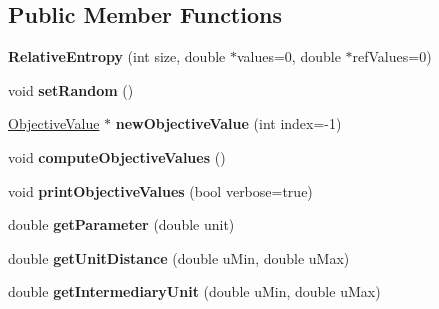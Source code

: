 \subsection*{Public Member Functions}
\begin{DoxyCompactItemize}
\item 
\hypertarget{classRelativeEntropy_a3681c506bf2071f11af6373ed2d2c570}{{\bfseries Relative\-Entropy} (int size, double $\ast$values=0, double $\ast$ref\-Values=0)}\label{classRelativeEntropy_a3681c506bf2071f11af6373ed2d2c570}

\item 
\hypertarget{classRelativeEntropy_aa34a724f03a10c7aa273cc6aa1444881}{void {\bfseries set\-Random} ()}\label{classRelativeEntropy_aa34a724f03a10c7aa273cc6aa1444881}

\item 
\hypertarget{classRelativeEntropy_a88c993870571948119498a5004879730}{\hyperlink{classObjectiveValue}{Objective\-Value} $\ast$ {\bfseries new\-Objective\-Value} (int index=-\/1)}\label{classRelativeEntropy_a88c993870571948119498a5004879730}

\item 
\hypertarget{classRelativeEntropy_ad2b1237540c333fc7bb7289579935598}{void {\bfseries compute\-Objective\-Values} ()}\label{classRelativeEntropy_ad2b1237540c333fc7bb7289579935598}

\item 
\hypertarget{classRelativeEntropy_affe7e822cc677fedfbc3ee259331763c}{void {\bfseries print\-Objective\-Values} (bool verbose=true)}\label{classRelativeEntropy_affe7e822cc677fedfbc3ee259331763c}

\item 
\hypertarget{classRelativeEntropy_ac021b7887e7ccb9d23a865ab3cdb0704}{double {\bfseries get\-Parameter} (double unit)}\label{classRelativeEntropy_ac021b7887e7ccb9d23a865ab3cdb0704}

\item 
\hypertarget{classRelativeEntropy_ab2173fffca585fc30bfe66ae2b3fd06a}{double {\bfseries get\-Unit\-Distance} (double u\-Min, double u\-Max)}\label{classRelativeEntropy_ab2173fffca585fc30bfe66ae2b3fd06a}

\item 
\hypertarget{classRelativeEntropy_a92c8e2ced62582fcd1dec801cedee04f}{double {\bfseries get\-Intermediary\-Unit} (double u\-Min, double u\-Max)}\label{classRelativeEntropy_a92c8e2ced62582fcd1dec801cedee04f}

\end{DoxyCompactItemize}
